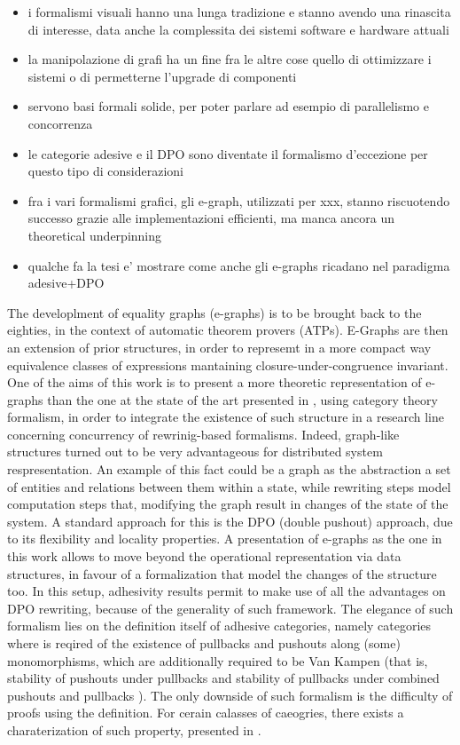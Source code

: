 \begin{itemize}
\item i formalismi visuali hanno una lunga tradizione e stanno avendo una rinascita di interesse, data anche la complessita dei sistemi software e hardware attuali
\item la manipolazione di grafi ha un fine fra le altre cose quello di ottimizzare i sistemi o di permetterne l'upgrade di componenti
\item servono basi formali solide, per poter parlare ad esempio di parallelismo e concorrenza
\item le categorie adesive e il DPO sono diventate il formalismo d'eccezione per questo tipo di considerazioni
\item fra i vari formalismi grafici, gli e-graph, utilizzati per xxx, stanno riscuotendo successo grazie alle implementazioni efficienti, ma manca ancora un theoretical underpinning
\item qualche fa la tesi e' mostrare come anche gli e-graphs ricadano nel paradigma adesive+DPO
\end{itemize}

The developlment of equality graphs (e-graphs) is to be brought back to the eighties, in the context of automatic theorem provers (ATPs). E-Graphs are then an extension of prior structures, in order to represemt in a more compact way equivalence classes of expressions mantaining closure-under-congruence invariant.
One of the aims of this work is to present a more theoretic representation of e-graphs than the one at the state of the art presented in \cite{egg}, using category theory formalism, in order to integrate the existence of such structure in a research line concerning concurrency of rewrinig-based formalisms.
Indeed, graph-like structures turned out to be very advantageous for distributed system respresentation.
An example of this fact could be a graph as the abstraction a set of entities and relations between them within a state, while rewriting steps model computation steps that, modifying the graph result in changes of the state of the system.
A standard approach for this is the DPO (double pushout) approach, due to its flexibility and locality properties.
A presentation of e-graphs as the one in this work allows to move beyond the operational representation via data structures, in favour of a formalization that model the changes of the structure too.
In this setup, adhesivity results permit to make use of all the advantages on DPO rewriting, because of the generality of such framework.
The elegance of such formalism lies on the definition itself of adhesive categories, namely categories where is reqired of the existence of pullbacks and pushouts along (some) monomorphisms, which are additionally required to be Van Kampen (that is, stability of pushouts under pullbacks and stability of pullbacks under combined pushouts and pullbacks \cite{Ehrig_Golas}).
The only downside of such formalism is the difficulty of proofs using the definition. For cerain calasses of caeogries, there exists a charaterization of such property, presented in \cite{castelnovo2022newcriterionmathcalmmathcalnadhesivity}.

